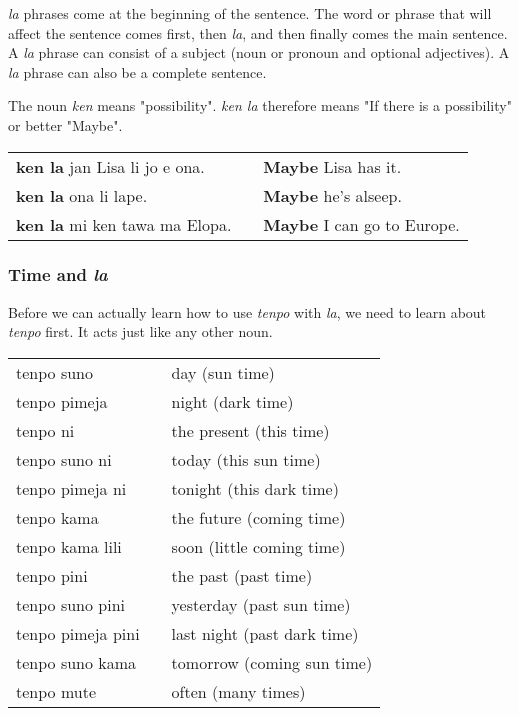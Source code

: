 \textit{la} phrases come at the beginning of the sentence. 
The word or phrase that will affect the sentence comes first, then \textit{la}, and then finally comes the main sentence. 
A \textit{la} phrase can consist of a subject (noun or pronoun and optional adjectives).
A \textit{la} phrase can also be a complete sentence.

The noun \textit{ken} means "possibility".
\textit{ken la} therefore means "If there is a possibility" or better "Maybe".
 
\begin{supertabular}{p{5,5cm}|ll}
\textbf{ken la} jan Lisa li jo e ona. && \textbf{Maybe} Lisa has it. \\
\textbf{ken la} ona li lape. && \textbf{Maybe} he's alseep. \\
\textbf{ken la} mi ken tawa ma Elopa. && \textbf{Maybe} I can go to Europe. \\
\end{supertabular} 
%
\subsubsection*{Time and \textit{la}}
%
Before we can actually learn how to use \textit{tenpo} with \textit{la}, we need to learn about \textit{tenpo} first. 
It acts just like any other noun. 

\begin{supertabular}{p{5,5cm}|ll}
tenpo suno && day (sun time) \\
tenpo pimeja && night (dark time) \\
tenpo ni && the present (this time) \\
tenpo suno ni && today (this sun time) \\
tenpo pimeja ni && tonight (this dark time) \\
tenpo kama && the future (coming time) \\
tenpo kama lili && soon (little coming time) \\
tenpo pini && the past (past time) \\
tenpo suno pini && yesterday (past sun time) \\
tenpo pimeja pini && last night (past dark time) \\
tenpo suno kama && tomorrow (coming sun time) \\
tenpo mute && often (many times) \\
\end{supertabular} 

